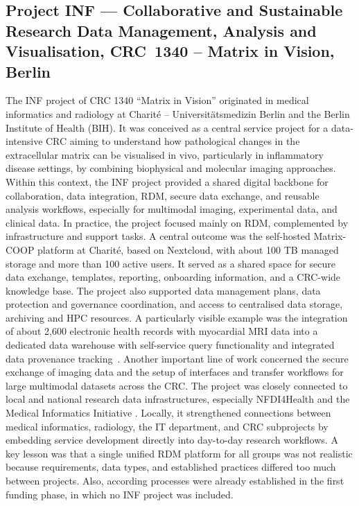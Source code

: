\documentclass{eceasst}
\begin{document}
\subsection{Project INF --- Collaborative and Sustainable Research Data Management, Analysis and Visualisation, CRC~1340 -- Matrix in Vision, Berlin} \label{sec:sfb1340}
The INF project of CRC 1340 “Matrix in Vision” originated in medical informatics and radiology at Charité – Universitätsmedizin Berlin and the Berlin Institute of Health (BIH).
It was conceived as a central service project for a data-intensive CRC aiming to understand how pathological changes in the extracellular matrix can be visualised in vivo, particularly in inflammatory disease settings, by combining biophysical and molecular imaging approaches.
Within this context, the INF project provided a shared digital backbone for collaboration, data integration, RDM, secure data exchange, and reusable analysis workflows, especially for multimodal imaging, experimental data, and clinical data.
In practice, the project focused mainly on RDM, complemented by infrastructure and support tasks.
A central outcome was the self-hosted Matrix-COOP platform at Charité, based on Nextcloud, with about 100 TB managed storage and more than 100 active users.
It served as a shared space for secure data exchange, templates, reporting, onboarding information, and a CRC-wide knowledge base.
The project also supported data management plans, data protection and governance coordination, and access to centralised data storage, archiving and HPC resources.
A particularly visible example was the integration of about 2,600 electronic health records with myocardial MRI data into a dedicated data warehouse with self-service query functionality and integrated data provenance tracking~\cite{johns_prov_tracking_2025}.
Another important line of work concerned the secure exchange of imaging data and the setup of interfaces and transfer workflows for large multimodal datasets across the CRC. The project was closely connected to local and national research data infrastructures, especially NFDI4Health \cite{fluck_bausteine_2021} and the Medical Informatics Initiative \cite{prasser_difuture_2018}.
Locally, it strengthened connections between medical informatics, radiology, the IT department, and CRC subprojects by embedding service development directly into day-to-day research workflows. A key lesson was that a single unified RDM platform for all groups was not realistic because requirements, data types, and established practices differed too much between projects.
Also, according processes were already established in the first funding phase, in which no INF project was included.
\end{document}
